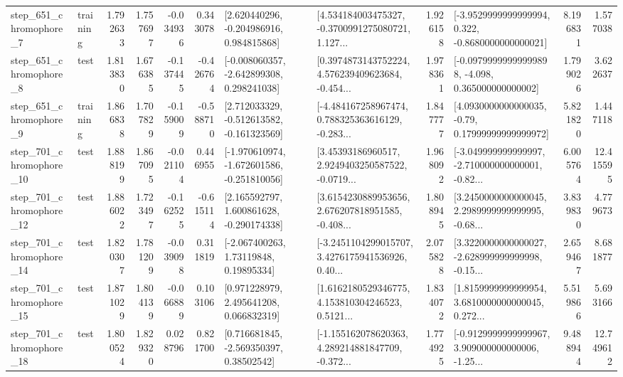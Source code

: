 \begin{tabular}{llrrrrllrlrr}
   step\_651\_chromophore\_7 &  training &      1.792633 &    1.757697 &     -0.034936 &  0.343078 &    [2.620440296, -0.204986916, 0.984815868] &  [4.534184003475327, -0.3700991275080721, 1.127... &       1.926158 &  [-3.9529999999999994, 0.322, -0.8680000000000021] &            8.196831 &          1.577038 \\
   step\_651\_chromophore\_8 &      test &      1.813830 &    1.676385 &     -0.137445 & -0.426764 &   [-0.008060357, -2.642899308, 0.298241038] &  [0.3974873143752224, 4.576239409623684, -0.454... &       1.978361 &  [-0.09799999999999898, -4.098, 0.365000000000002] &            1.799026 &          3.622637 \\
   step\_651\_chromophore\_9 &  training &      1.866838 &    1.707829 &     -0.159009 & -0.588710 &   [2.712033329, -0.512613582, -0.161323569] &  [-4.484167258967474, 0.788325363616129, -0.283... &       1.847777 &   [4.0930000000000035, -0.79, 0.17999999999999972] &            5.821820 &          1.447118 \\
  step\_701\_chromophore\_10 &      test &      1.888199 &    1.867095 &     -0.021104 &  0.446955 &  [-1.970610974, -1.672601586, -0.251810056] &  [3.45393186960517, 2.9249403250587522, -0.0719... &       1.968092 &  [-3.049999999999997, -2.710000000000001, -0.82... &            6.005764 &         12.415595 \\
  step\_701\_chromophore\_12 &      test &      1.886022 &    1.723497 &     -0.162525 & -0.615114 &    [2.165592797, 1.600861628, -0.290174338] &  [3.6154230889953656, 2.676207818951585, -0.408... &       1.808945 &  [3.2450000000000045, 2.2989999999999995, -0.68... &            3.839830 &          4.779673 \\
  step\_701\_chromophore\_14 &      test &      1.820307 &    1.781209 &     -0.039098 &  0.311819 &      [-2.067400263, 1.73119848, 0.19895334] &  [-3.2451104299015707, 3.4276175941536926, 0.40... &       2.075828 &  [3.3220000000000027, -2.628999999999998, -0.15... &            2.659467 &          8.681877 \\
  step\_701\_chromophore\_15 &      test &      1.871029 &    1.804139 &     -0.066889 &  0.103106 &     [0.971228979, 2.495641208, 0.066832319] &  [1.6162180529346775, 4.153810304246523, 0.5121... &       1.834072 &  [1.8159999999999954, 3.6810000000000045, 0.272... &            5.519866 &          5.693166 \\
  step\_701\_chromophore\_18 &      test &      1.800524 &    1.829320 &      0.028796 &  0.821700 &     [0.716681845, -2.569350397, 0.38502542] &  [-1.155162078620363, 4.289214881847709, -0.372... &       1.774925 &  [-0.9129999999999967, 3.909000000000006, -1.25... &            9.488944 &         12.749612 \\

\end{tabular}
